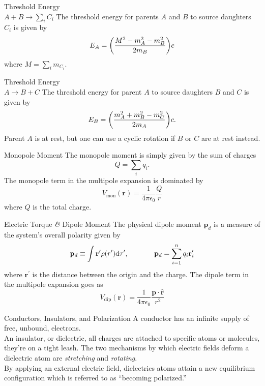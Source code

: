 \documentclass[avery5371,grid]{flashcards}
\begin{document}
\begin{flashcard}[Problem]{Threshold Energy\\ $A+B\to\sum_{i} C_i$}
	The threshold energy for parents $A$ and $B$ to source daughters $C_i$ is given by
	\begin{equation*}
		E_A = \qty(\frac{M^2 - m_A^2 - m_B^2}{2m_B})c
	\end{equation*}
	where $M= \sum_i m_{C_i}$. 
\end{flashcard}

\begin{flashcard}[Problem]{Threshold Energy\\$A \to B + C$}
	The threshold energy for parent $A$ to source daughters $B$ and $C$ is given by
	\begin{equation*}
		E_B = \qty(\frac{m_A^2 + m_B^2 - m_C^2}{2m_A})c.
	\end{equation*}
	Parent $A$ is at rest, but one can use a cyclic rotation if $B$ or $C$ are at rest instead.
\end{flashcard}


\begin{flashcard}[Definition]{Monopole Moment}
	The monopole moment is simply given by the sum of charges $$Q = \sum_i q_i.$$ The monopole term in the multipole expansion is dominated by
	\begin{equation*}
		V_{\text{mon}}(\mathbf{r}) = \frac{1}{4\pi \epsilon_0} \frac{Q}{r}
	\end{equation*}
	where $Q$ is the total charge.
\end{flashcard}

\begin{flashcard}[Definition]{Electric Torque \textit{\&} Dipole Moment}
	The physical dipole moment $\mathbf{p}_d$ is a measure of the system's overall polarity given by 
	\[
		\mathbf{p}_d \equiv \int \mathbf{r}^\prime\rho(r^\prime)\dd\tau^\prime,\hspace{.5in} \mathbf{p}_{d} = \sum_{i=1}^{n}q_i {\mathbf{r}}_i^\prime
	\]
	where $\mathbf{r}^\prime$ is the distance between the origin and the charge. The dipole term in the multipole expansion goes as
	\begin{equation*}
		V_{\text{dip}}(\mathbf{r}) = \frac{1}{4\pi \epsilon_0}\frac{\mathbf{p}\cdot\hat{\mathbf{r}}}{r^2}
	\end{equation*}
\end{flashcard}

\begin{flashcard}[Definition]{Conductors, Insulators, and Polarization}
	A conductor has an infinite supply of free, unbound, electrons.\\

	An insulator, or dielectric, all charges are attached to specific atoms or molecules, they're on a tight leash. The two mechanisms by which electric fields deform a dielectric atom are \textit{stretching} and \textit{rotating}.\\

	By applying an external electric field, dielectrics atoms attain a new equilibrium configuration which is referred to as ``becoming polarized.''
\end{flashcard}
\end{document}
